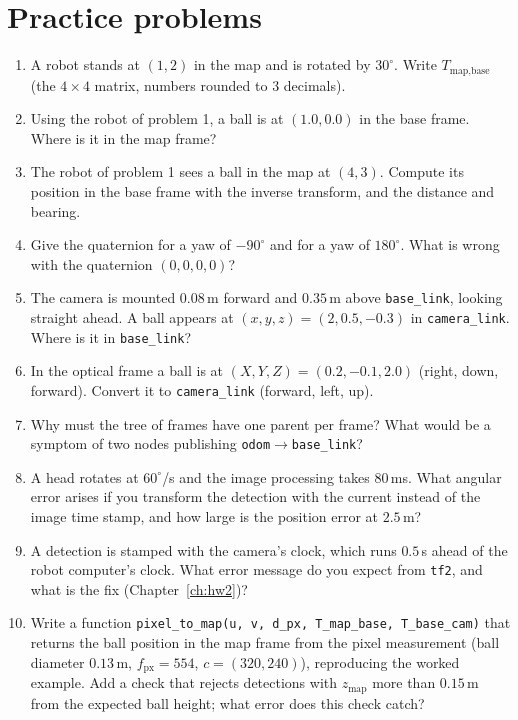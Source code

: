 \section*{Practice problems}
\begin{enumerate}[label=\textbf{\thechapter.\arabic*}]
  \item A robot stands at $(1,2)$ in the map and is rotated by $30^\circ$. Write $T_\text{map,base}$ (the $4\times4$ matrix, numbers rounded to $3$ decimals).
  \item Using the robot of problem 1, a ball is at $(1.0,0.0)$ in the base frame. Where is it in the map frame?
  \item The robot of problem 1 sees a ball in the map at $(4,3)$. Compute its position in the base frame with the inverse transform, and the distance and bearing.
  \item Give the quaternion for a yaw of $-90^\circ$ and for a yaw of $180^\circ$. What is wrong with the quaternion $(0,0,0,0)$?
  \item The camera is mounted $0.08$\,m forward and $0.35$\,m above \verb!base_link!, looking straight ahead. A ball appears at $(x,y,z)=(2,0.5,-0.3)$ in \verb!camera_link!. Where is it in \verb!base_link!?
  \item In the optical frame a ball is at $(X,Y,Z)=(0.2,-0.1,2.0)$ (right, down, forward). Convert it to \verb!camera_link! (forward, left, up).
  \item Why must the tree of frames have one parent per frame? What would be a symptom of two nodes publishing \verb!odom!$\to$\verb!base_link!?
  \item A head rotates at $60^\circ$/s and the image processing takes $80$\,ms. What angular error arises if you transform the detection with the current instead of the image time stamp, and how large is the position error at $2.5$\,m?
  \item A detection is stamped with the camera's clock, which runs $0.5$\,s ahead of the robot computer's clock. What error message do you expect from \verb!tf2!, and what is the fix (Chapter~\ref{ch:hw2})?
  \item[\textbf{\thechapter.10}$\star$] Write a function \verb!pixel_to_map(u, v, d_px, T_map_base, T_base_cam)! that returns the ball position in the map frame from the pixel measurement (ball diameter $0.13$\,m, $f_\text{px}=554$, $c=(320,240)$), reproducing the worked example. Add a check that rejects detections with $z_\text{map}$ more than $0.15$\,m from the expected ball height; what error does this check catch?
\end{enumerate}
